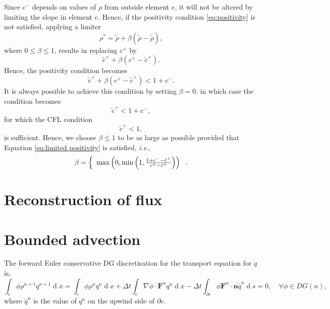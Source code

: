 \documentclass{article}
\def\MM#1{\boldsymbol{#1}}
\def\MM#1{\boldsymbol{#1}}
\DeclareMathOperator{\diff}{d}
\begin{document}
Since $c^-$ depends on values of $\rho$ from outside element $e$,
it will not be altered by limiting the slope in element $e$. Hence,
if the positivity condition \eqref{eq:positivity} is not satisfied,
applying a limiter
\begin{equation}
\rho^* = \overline{\tilde{\rho}} + \beta\left(
\tilde{\rho} - \overline{\tilde{\rho}}
\right),
\end{equation}
where $0\le \beta \le 1$, results in replacing $c^+$ by
\begin{equation}
\tilde{c}^+ + \beta(c^+-\tilde{c}^+).
\end{equation}
Hence, the positivity condition becomes
\begin{equation}
\label{eq:limited positivity}
\tilde{c}^+ + \beta(c^+-\tilde{c}^+) < 1 + c^-.
\end{equation}
It is always possible to achieve this condition by setting
$\beta=0$, in which case the condition becomes
\begin{equation}
\tilde{c}^+ < 1 + c^-,
\end{equation}
for which the CFL condition
\begin{equation}
\tilde{c}^+ < 1,
\end{equation}
is sufficient. Hence, we choose $\beta\leq 1$ to be as
large as possible provided that Equation \eqref{eq:limited positivity}
is satisfied, \emph{i.e.},
\begin{equation}
\beta =
\left\{
\begin{array}{c r}
 \max\left(0,\min\left(1,\frac{1 + c^- - \tilde{c}^+}
{c^+-\tilde{c}^+}\right)\right)
\end{array}\right..
\end{equation}

\section{Reconstruction of flux}

\section{Bounded advection}

The forward Euler conservative DG discretisation for the transport
equation for $q$ is,
\begin{equation}
\int_e \phi \rho^{n+1}q^{n+1} \diff x 
= \int_e \phi \rho^nq^n \diff x 
+ \Delta t \int_e \nabla \phi \cdot\MM{F}^n q^n\diff x
- \Delta t\int_{\partial e} \phi \MM{F}^n\cdot\MM{n} \tilde{q}^n \diff s = 0,
\quad \forall \phi \in DG(n),
\end{equation}
where $\tilde{q}^n$ is the value of $q^n$ on the upwind side of
$\partial e$.
\end{document}
